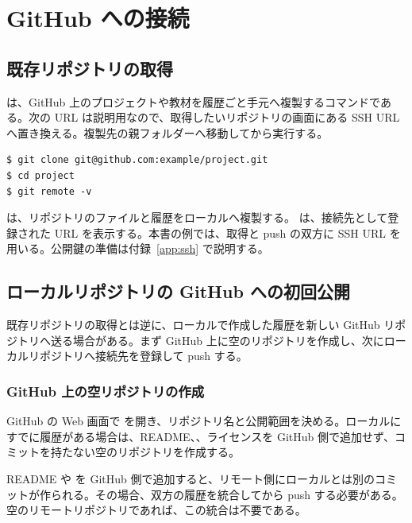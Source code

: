 \section{GitHub への接続}

\subsection{既存リポジトリの取得}

 は、GitHub 上のプロジェクトや教材を履歴ごと手元へ複製するコマンドである。次の URL は説明用なので、取得したいリポジトリの画面にある SSH URL へ置き換える。複製先の親フォルダーへ移動してから実行する。

\begin{lstlisting}[numbers=none, xleftmargin=2\zw]
$ git clone git@github.com:example/project.git
$ cd project
$ git remote -v
\end{lstlisting}

 は、リポジトリのファイルと履歴をローカルへ複製する。 は、接続先として登録された URL を表示する。本書の例では、取得と push の双方に SSH URL を用いる。公開鍵の準備は付録~\ref{app:ssh} で説明する。

\subsection{ローカルリポジトリの GitHub への初回公開}

既存リポジトリの取得とは逆に、ローカルで作成した履歴を新しい GitHub リポジトリへ送る場合がある。まず GitHub 上に空のリポジトリを作成し、次にローカルリポジトリへ接続先を登録して push する。

\subsubsection{GitHub 上の空リポジトリの作成}

GitHub の Web 画面で  を開き、リポジトリ名と公開範囲を決める。ローカルにすでに履歴がある場合は、README、、ライセンスを GitHub 側で追加せず、コミットを持たない空のリポジトリを作成する。

README や  を GitHub 側で追加すると、リモート側にローカルとは別のコミットが作られる。その場合、双方の履歴を統合してから push する必要がある。空のリモートリポジトリであれば、この統合は不要である。

